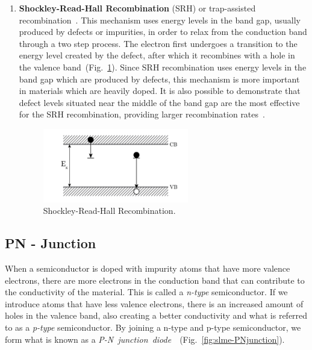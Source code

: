 \begin{refsection}
\begin{enumerate}[]
\vspace{0.2in} 
	\item\textbf{Shockley-Read-Hall Recombination} (SRH) or trap-assisted 
recombination~\cite{Shockley1952}\cite{Hall1952}. This mechanism uses energy 
levels in the band gap, usually produced by defects or impurities, in order to 
relax from the conduction band through a two step process. The electron first 
undergoes a transition to the energy level created by the defect, after which 
it recombines with a hole in the valence band~(Fig.~\ref{fig:slme-SRHrec}). 
Since SRH recombination uses energy levels in the band gap which are produced 
by defects, this mechanism is more important in materials which are heavily 
doped. It is also possible to demonstrate that defect levels situated near the 
middle of the band gap are the most effective for the SRH recombination, 
providing larger recombination rates~\cite{Green1981}. 
 
\begin{figure}[!htp]  
\centering 
\includegraphics[width=0.6\textwidth]{./Figures/slme/SRHrec.png} 
\caption{\label{fig:slme-SRHrec}Shockley-Read-Hall Recombination.} 
\end{figure} 
 
\end{enumerate} 
 
\pagebreak[4] 
\subsection{PN - Junction} 
 
When a semiconductor is doped with impurity atoms that have more valence 
electrons, there are more electrons in the conduction band that can contribute 
to the conductivity of the material. This is called a \textit{n-type} 
semiconductor. If we introduce atoms that have less valence electrons, there 
is an increased amount of holes in the valence band, also creating a better 
conductivity and what is referred to as a \textit{p-type} semiconductor. By 
joining a n-type and p-type semiconductor, we form what is known as a 
\textit{P-N~junction~diode}~\cite{Shockley1949}~(Fig.~\ref{fig:slme-PNjunction}). 
 

\end{refsection}
